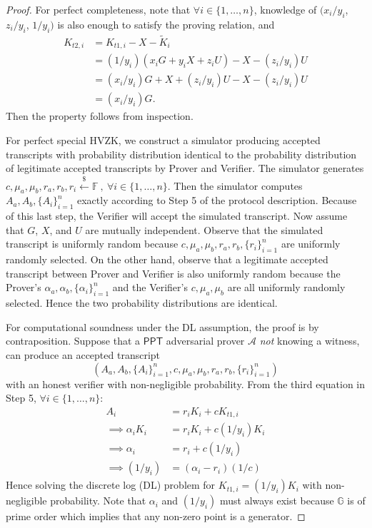 \documentclass{article}
\begin{document}
\begin{proof}
For perfect completeness, note that $\forall i\in\{1,\ldots,n\}$, knowledge of $(x_i/y_i$, $z_i/y_i$, $1/y_i)$ is also enough to satisfy the proving relation, and
\begin{align*}
K_{t2,i} &= K_{t1,i} - X - \tilde{K}_i \\ &= (1/y_i)(x_i G + y_i X + z_i U) - X - (z_i/y_i)U \\
&= (x_i/y_i)G + X + (z_i/y_i) U - X - (z_i/y_i)U \\ &= (x_i/y_i)G.
\end{align*}
Then the property follows from inspection.

For perfect special HVZK, we construct a simulator producing accepted transcripts with probability distribution identical to the probability distribution of legitimate accepted transcripts by Prover and Verifier. The simulator generates $c, \mu_a, \mu_b, r_a, r_b, r_i \xleftarrow{\$}\mathbb{F}\ ,\ \forall i\in\{1,\ldots,n\}$. Then the simulator computes $A_{a}, A_{b}, \{A_{i}\}_{i=1}^n$ exactly according to Step 5 of the protocol description. Because of this last step, the Verifier will accept the simulated transcript. Now assume that $G$, $X$, and $U$ are mutually independent. Observe that the simulated transcript is uniformly random because $c, \mu_a, \mu_b, r_a, r_b, \{r_i\}_{i=1}^n$ are uniformly randomly selected. On the other hand, observe that a legitimate accepted transcript between Prover and Verifier is also uniformly random because the Prover's $\alpha_a, \alpha_b, \{\alpha_i\}_{i=1}^n$ and the Verifier's $c, \mu_a, \mu_b$ are all uniformly randomly selected. Hence the two probability distributions are identical.

For computational soundness under the DL assumption, the proof is by contraposition. Suppose that a $\textsf{PPT}$ adversarial prover $\mathcal{A}$ \textit{not} knowing a witness, can produce an accepted transcript $$(A_a, A_b, \{A_i\}_{i=1}^n,c, \mu_a, \mu_b, r_a, r_b, \{r_i\}_{i=1}^n)$$ with an honest verifier with non-negligible probability. From the third equation in Step 5, $\forall i\in\{1,\ldots,n\}$:
\begin{align*}
A_{i} &= r_i K_i + c K_{t1,i} \\
\implies\alpha_i K_i &= r_i K_i + c (1/y_i)K_i \\
\implies\alpha_i &= r_i + c(1/y_i) \\
\implies(1/y_i) &= (\alpha_i - r_i)(1/c)
\end{align*}
Hence solving the discrete log (DL) problem for $K_{t1,i} = (1/y_i)K_i$ with non-negligible probability. Note that $\alpha_i$ and $(1/y_i)$ must always exist because $\mathbb{G}$ is of prime order which implies that any non-zero point is a generator.
\end{proof}
\end{document}

